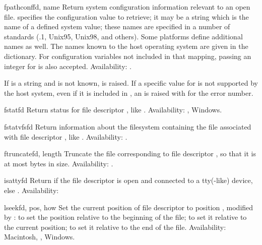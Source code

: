 \begin{funcdesc}{fpathconf}{fd, name}
Return system configuration information relevant to an open file.
 specifies the configuration value to retrieve; it may be a
string which is the name of a defined system value; these names are
specified in a number of standards (\POSIX.1, Unix95, Unix98, and
others).  Some platforms define additional names as well.  The names
known to the host operating system are given in the
 dictionary.  For configuration variables not
included in that mapping, passing an integer for  is also
accepted.
Availability: \UNIX{}.

If  is a string and is not known,  is
raised.  If a specific value for  is not supported by the
host system, even if it is included in , an
 is raised with  for the
error number.
\end{funcdesc}

\begin{funcdesc}{fstat}{fd}
Return status for file descriptor , like .
Availability: \UNIX{}, Windows.
\end{funcdesc}

\begin{funcdesc}{fstatvfs}{fd}
Return information about the filesystem containing the file associated
with file descriptor , like .
Availability: \UNIX{}.
\end{funcdesc}

\begin{funcdesc}{ftruncate}{fd, length}
Truncate the file corresponding to file descriptor , 
so that it is at most  bytes in size.
Availability: \UNIX{}.
\end{funcdesc}

\begin{funcdesc}{isatty}{fd}
Return  if the file descriptor  is open and connected to a
tty(-like) device, else .
Availability: \UNIX{}
\end{funcdesc}

\begin{funcdesc}{lseek}{fd, pos, how}
Set the current position of file descriptor  to position
, modified by :  to set the position
relative to the beginning of the file;  to set it relative to
the current position;  to set it relative to the end of the
file.
Availability: Macintosh, \UNIX{}, Windows.
\end{funcdesc}

